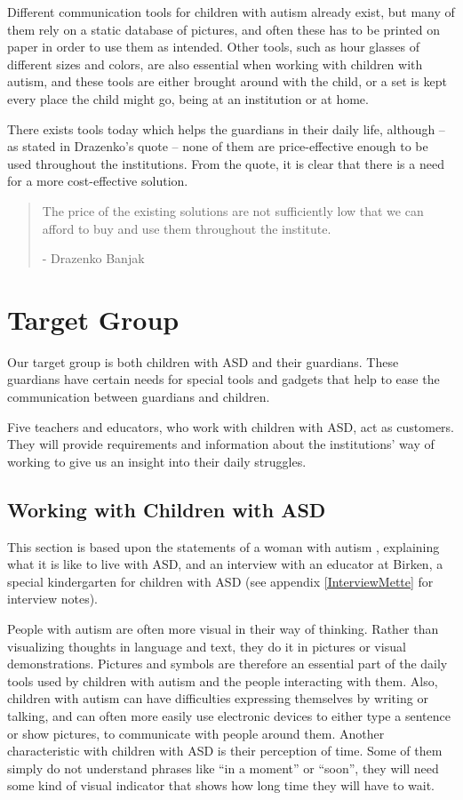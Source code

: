 Different communication tools for children with autism already exist, but many of them rely on a static database of pictures, and often these has to be printed on paper in order to use them as intended. Other tools, such as hour glasses of different sizes and colors, are also essential when working with children with autism, and these tools are either brought around with the child, or a set is kept every place the child might go, being at an institution or at home.

There exists tools today which helps the guardians in their daily life, although -- as stated in Drazenko's quote -- none of them are price-effective enough to be used throughout the institutions. From the quote, it is clear that there is a need for a more cost-effective solution.

\begin{quotation}
The price of the existing solutions are not sufficiently low that we can afford to buy and use them throughout the institute.\\ 
	\begin{flushright}
		- Drazenko Banjak
	\end{flushright}
\end{quotation}\section{Target Group}
Our target group is both children with ASD and their guardians. These guardians have certain needs for special tools and gadgets that help to ease the communication between guardians and children.

Five teachers and educators, who work with children with ASD, act as customers. They will provide requirements and information about the institutions' way of working to give us an insight into their daily struggles.

\subsection{Working with Children with ASD}
This section is based upon the statements of a woman with autism \cite{autism.com}, explaining what it is like to live with ASD, and an interview with an educator at Birken, a special kindergarten for children with ASD (see appendix \ref{InterviewMette} for interview notes).

	People with autism are often more visual in their way of thinking. Rather than visualizing thoughts in language and text, they do it in pictures or visual demonstrations. Pictures and symbols are therefore an essential part of the daily tools used by children with autism and the people interacting with them. Also, children with autism can have difficulties expressing themselves by writing or talking, and can often more easily use electronic devices to either type a sentence or show pictures, to communicate with people around them.
	Another characteristic with children with ASD is their perception of time. Some of them simply do not understand phrases like "`in a moment"' or "`soon"', they will need some kind of visual indicator that shows how long time they will have to wait.

